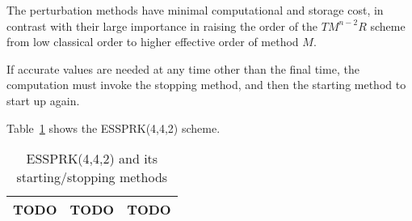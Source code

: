 The perturbation methods have minimal computational and storage cost, in
contrast with their large importance in raising the order of the \(
TM^{n-2}R \) scheme from low classical order to higher effective order of
method \( M \).

If accurate values are needed at any time other than the final time, the
computation must invoke the stopping method, and then the starting method to start up again. 

Table~\ref{tab:essprk442} shows the ESSPRK(4,4,2) scheme.

\begin{table}
  \caption{ESSPRK(4,4,2) and its starting/stopping methods}
  \label{tab:essprk442}
  \centering
  \begin{tabular}{|c|c|c|}
    \hline
    TODO & TODO & TODO \\
    \hline
  \end{tabular}
\end{table}
